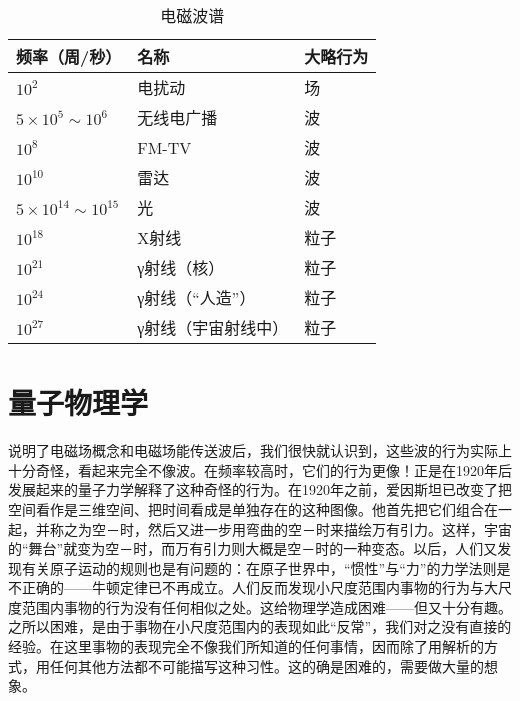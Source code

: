 \documentclass[11pt,oneside]{book}
\begin{document}
\begin{common-format}
\begin{table}[H]
\centering
\label{tab:电磁波谱}
\caption{电磁波谱}
\medskip 
\begin{tabular}{@{}lll@{}}
\toprule
频率（周/秒）                     & 名称         & 大略行为 \\ \midrule
$10^{2}$                    & 电扰动        & 场    \\
$5\times10^{5}\sim10^{6}$   & 无线电广播      & 波    \\
$10^{8}$                    & FM-TV      & 波    \\
$10^{10}$                   & 雷达         & 波    \\
$5\times10^{14}\sim10^{15}$ & 光          & 波    \\
$10^{18}$                   & X射线        & 粒子   \\
$10^{21}$                   & γ射线（核）     & 粒子   \\
$10^{24}$                   & γ射线（“人造”）  & 粒子   \\
$10^{27}$                   & γ射线（宇宙射线中） & 粒子  \\ \bottomrule
\end{tabular}
\end{table}


\section{量子物理学}
说明了电磁场概念和电磁场能传送波后，我们很快就认识到，这些波的行为实际上十分奇怪，看起来完全不像波。在频率较高时，它们的行为更像！正是在1920年后发展起来的量子力学解释了这种奇怪的行为。在1920年之前，爱因斯坦已改变了把空间看作是三维空间、把时间看成是单独存在的这种图像。他首先把它们组合在一起，并称之为空－时，然后又进一步用弯曲的空－时来描绘万有引力。这样，宇宙的“舞台”就变为空－时，而万有引力则大概是空－时的一种变态。以后，人们又发现有关原子运动的规则也是有问题的：在原子世界中，“惯性”与“力”的力学法则是不正确的——牛顿定律已不再成立。人们反而发现小尺度范围内事物的行为与大尺度范围内事物的行为没有任何相似之处。这给物理学造成困难——但又十分有趣。之所以困难，是由于事物在小尺度范围内的表现如此“反常”，我们对之没有直接的经验。在这里事物的表现完全不像我们所知道的任何事情，因而除了用解析的方式，用任何其他方法都不可能描写这种习性。这的确是困难的，需要做大量的想象。


\end{common-format}
\end{document}
